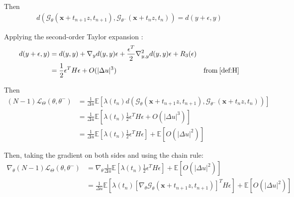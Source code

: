 \noindent Then
\begin{align}
    d \left(\mathcal{G}_{\theta}(\mathbf{x} + t_{n+1}z, t_{n+1}), \mathcal{G}_{\theta^-}(\mathbf{x} + t_nz, t_{n}) \right) = d(y + \epsilon, y) 
\end{align}

\noindent Applying the second-order Taylor expansion :
\begin{align}
    d(y + \epsilon, y) & = d(y, y) +\nabla_y d(y,y) \epsilon + \frac{\epsilon^T}{2}\nabla_{y,y}^2d(y,y)\epsilon + R_3(\epsilon) \\
    & = \frac{1}{2}\epsilon^T H \epsilon + O(|\Delta u|^3) & \text{from} \: \ref{def:H}
\end{align}

\noindent Then
\begin{align}
     (N - 1) \mathcal{L}_{\Theta}(\theta, \theta^{-}) & = \frac{1}{\Delta u}\mathbb{E}\left[ \lambda(t_n) d \left(\mathcal{G}_{\theta}(\mathbf{x} + t_{n+1}z, t_{n+1}), \mathcal{G}_{\theta^-}(\mathbf{x} + t_nz, t_{n})\right)\right] \\
     & = \frac{1}{\Delta u}\mathbb{E}\left[ \lambda(t_n) \frac{1}{2}\epsilon^T H \epsilon + O(|\Delta u|^3)\right] \\
     & = \frac{1}{\Delta u}\mathbb{E}\left[ \lambda(t_n) \frac{1}{2}\epsilon^T H \epsilon \right] + \mathbb{E}\left[O(|\Delta u|^2)\right]
\end{align}

\noindent Then, taking the gradient on both sides and using the chain rule:
\begin{align}
     \nabla_{\theta}(N - 1) \mathcal{L}_{\Theta}(\theta, \theta^{-}) & = \nabla_{\theta}\frac{1}{\Delta u}\mathbb{E}\left[ \lambda(t_n) \frac{1}{2}\epsilon^T H \epsilon \right] + \mathbb{E}\left[O(|\Delta u|^2)\right] \\
     & = \frac{1}{\Delta u}\mathbb{E}\left[ \lambda(t_n) \left[\nabla_{\theta} \mathcal{G}_{\theta}(\mathbf{x} + t_{n+1}z, t_{n+1})\right]^T H \epsilon \right] + \mathbb{E}\left[O(|\Delta u|^2)\right] \label{eq:continuous}
\end{align}

